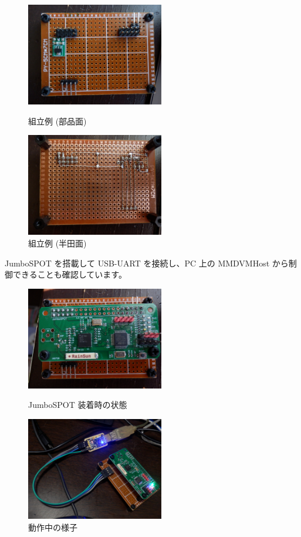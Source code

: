 \documentclass[a4j,oneside]{ujbook}
\begin{document}
\begin{figure}[H]
 \begin{minipage}[t]{0.5\hsize}
  \centering
  \includegraphics[width=6cm]{img/p2234402.jpg}
  \caption{組立例 (部品面)}
 \end{minipage}
 \begin{minipage}[t]{0.5\hsize}
  \centering
  \includegraphics[width=6cm]{img/p2234403.jpg}
  \caption{組立例 (半田面)}
 \end{minipage}
\end{figure}

JumboSPOT を搭載して USB-UART を接続し、PC 上の MMDVMHost から制御できることも確認しています。

\begin{figure}[H]
 \begin{minipage}[t]{0.5\hsize}
  \centering
  \includegraphics[width=6cm]{img/p2234401.jpg}
  \caption{JumboSPOT 装着時の状態}
 \end{minipage}
 \begin{minipage}[t]{0.5\hsize}
  \centering
  \includegraphics[width=6cm]{img/p2234409.jpg}
  \caption{動作中の様子}
 \end{minipage}
\end{figure}
\end{document}
